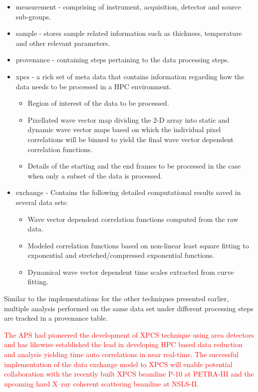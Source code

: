 \documentclass[pdf]{iucr}              %
\begin{document}
\begin{itemize}
\item measurement - comprising of instrument, acquisition, detector and source sub-groups.
\item sample - stores sample related information such as thickness, temperature and other relevant parameters.
\item provenance - containing steps pertaining to the data processing steps.
\item xpcs - a rich set of meta data that contains information regarding how the data needs to be processed in a HPC environment.
	\begin{itemize}
	\item Region of interest of the data to be processed.
	\item Pixellated wave vector map dividing the 2-D array into static and dynamic wave vector maps based on which the individual pixel correlations will be binned to yield the final wave vector dependent correlation functions.
	\item Details of the starting and the end frames to be processed in the case when only a subset of the data is processed.
	\end{itemize}

\item exchange - Contains the following detailed computational results saved in several data sets:
	\begin{itemize}
		\item Wave vector dependent correlation functions computed from the raw data.
		\item Modeled correlation functions based on non-linear least square fitting to exponential and stretched/compressed exponential functions.
		\item Dynamical wave vector dependent time scales extracted from curve fitting.
	\end{itemize}
\end{itemize}

Similar to the implementations for the other techniques presented earlier, multiple analysis performed on the same data set under different processing steps are tracked in a provenance table.

\textcolor{red}{The APS had pioneered the development of XPCS technique using area detectors and has likewise established the lead in developing HPC based data reduction and analysis yielding time auto correlations in near real-time. The successful implementation of the data exchange model to XPCS will enable potential collaboration with the recently built XPCS beamline P-10 at PETRA-III and the upcoming hard X--ray coherent scattering beamline at NSLS-II. }
\end{document}
